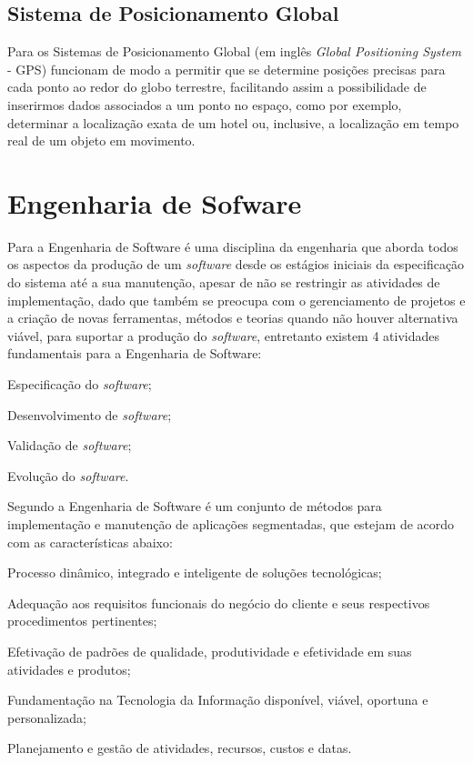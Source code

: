 \subsection{Sistema de Posicionamento Global}

Para  os Sistemas de Posicionamento Global (em inglês \textit{Global Positioning System} - GPS) funcionam de modo a permitir que se determine posições precisas para cada ponto ao redor do globo terrestre, facilitando assim a possibilidade de inserirmos dados associados a um ponto no espaço, como por exemplo, determinar a localização exata de um hotel ou, inclusive, a localização em tempo real de um objeto em movimento.

\section{Engenharia de Sofware}

Para  a Engenharia de Software é uma disciplina da engenharia que aborda todos os aspectos da produção de um \textit{software} desde os estágios iniciais da especificação do sistema até a sua manutenção, apesar de não se restringir as atividades de implementação, dado que também se preocupa com o gerenciamento de projetos e a criação de novas ferramentas, métodos e teorias quando não houver alternativa viável, para suportar a produção do \textit{software}, entretanto existem 4 atividades fundamentais para a Engenharia de Software:

\begin{lista}
\item Especificação do \textit{software};
\item Desenvolvimento de \textit{software};
\item Validação de \textit{software};
\item Evolução do \textit{software}.
\end{lista}

Segundo  a Engenharia de Software é um conjunto de métodos para implementação e manutenção de aplicações segmentadas, que estejam de acordo com as características abaixo:

\begin{lista}
\item Processo dinâmico, integrado e inteligente de soluções tecnológicas;
\item Adequação aos requisitos funcionais do negócio do cliente e seus respectivos procedimentos pertinentes;
\item Efetivação de padrões de qualidade, produtividade e efetividade em suas atividades e produtos;
\item Fundamentação na Tecnologia da Informação disponível, viável, oportuna e personalizada;
\item Planejamento e gestão de atividades, recursos, custos e datas.
\end{lista}

